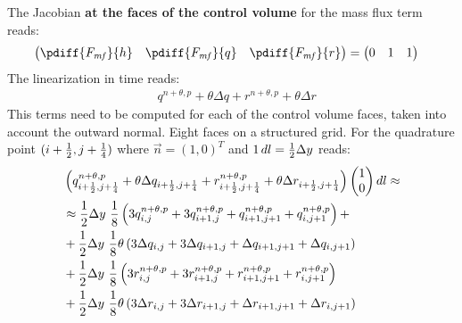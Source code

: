 The Jacobian \textbf{at the faces of the control volume} for the mass flux term
reads:
\begin{align}
    &\begin{pmatrix}
        \pdiff{F_{{\it mf}}}{h} & \pdiff{F_{{\it mf}}}{q} & \pdiff{F_{{\it mf}}}{r}
    \end{pmatrix}
    =
    \begin{pmatrix}
        0 & 1 & 1
    \end{pmatrix}
\end{align}
The linearization in time reads:
\begin{align}
    &q^{n+\theta, p} + \theta \Delta q  + r^{n+\theta, p} + \theta \Delta r
\end{align}
This terms need to be computed for each of the control volume faces, taken into account the outward normal.
Eight faces on a structured grid.
For the quadrature point $(i+\frac{1}{2}, j+\frac{1}{4})$ where $\vec{n} = (1,0)^T$ and $1\, dl = \frac{1}{2} \Delta y$ reads:
\begin{align}
  &\left( q^{n+\theta, p}_{i+\frac{1}{2}, j+\frac{1}{4}} + \theta \Delta q_{i+\frac{1}{2}, j+\frac{1}{4}}  + r^{n+\theta, p}_{i+\frac{1}{2}, j+\frac{1}{4}} + \theta \Delta r_{i+\frac{1}{2}, j+\frac{1}{4}} \right) \begin{pmatrix} 1 \\ 0 \end{pmatrix} dl \approx
  \\*
 & \approx \frac{1}{2} \Delta y\ \frac{1}{8} \left( 3 q^{n+\theta, p}_{i,j} + 3 q^{n+\theta, p}_{i+1,j} + q^{n+\theta, p}_{i+1, j+1} + q^{n+\theta, p}_{i, j+1} \right)
 +
 \\*
 &+ \frac{1}{2} \Delta y\ \frac{1}{8} \theta \left( 3 \Delta q_{i,j} + 3 \Delta q_{i+1,j} + \Delta q_{i+1, j+1} + \Delta q_{i, j+1} \right)
 \\*
 &+\frac{1}{2} \Delta y\ \frac{1}{8} \left( 3 r^{n+\theta, p}_{i,j} + 3 r^{n+\theta, p}_{i+1,j} + r^{n+\theta, p}_{i+1, j+1} + r^{n+\theta, p}_{i, j+1} \right)
\\*
&+ \frac{1}{2} \Delta y\ \frac{1}{8} \theta \left( 3 \Delta r_{i,j} + 3 \Delta r_{i+1,j} + \Delta r_{i+1, j+1} + \Delta r_{i, j+1} \right)
\\*
\end{align}
